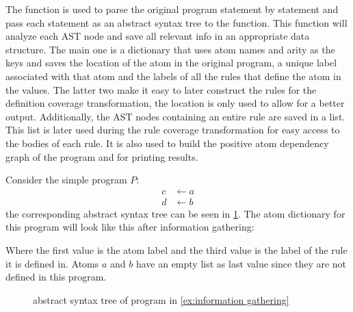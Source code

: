 The  function is used to parse the original program statement by statement and pass each statement as an abstract syntax tree to the  function. This function will analyze each AST node and save all relevant info in an appropriate data structure. The main one is a dictionary that uses atom names and arity as the keys and saves the location of the atom in the original program, a unique label associated with that atom and the labels of all the rules that define the atom in the values. The latter two make it easy to later construct the rules for the definition coverage transformation, the location is only used to allow for a better output. Additionally, the AST nodes containing an entire rule are saved in a list. This list is later used during the rule coverage transformation for easy access to the bodies of each rule. It is also used to build the positive atom dependency graph of the program and for printing results.

\begin{example}
\label{ex:information gathering}
    Consider the simple program $P$:
    \begin{align*}
        c &\leftarrow a \\
        d &\leftarrow b
    \end{align*}
    the corresponding abstract syntax tree can be seen in \cref{fig:ast example}. The atom dictionary for this program will look like this after information gathering:
    

    Where the first value is the atom label and the third value is the label of the rule it is defined in. Atoms $a$ and $b$ have an empty list as last value since they are not defined in this program.
\end{example}

\begin{figure}[h]
    \centering
    \caption{abstract syntax tree of program in \cref{ex:information gathering}}
    \label{fig:ast example}
\end{figure}

